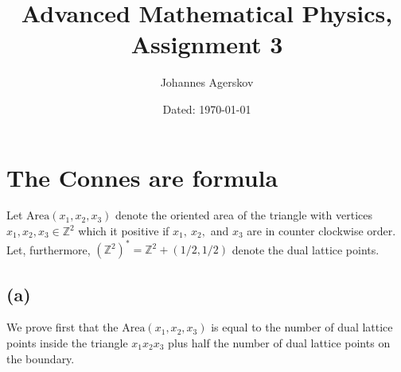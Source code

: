 \documentclass[a4paper,11pt]{article}
\author{Johannes Agerskov}
\date{Dated: \today}
\title{Advanced Mathematical Physics, Assignment 3}
\newcommand{\Z}{\mathbb{Z}}
\newcommand{\Area}{\text{Area}}
\numberwithin{equation}{section}
\begin{document}
	\maketitle

\section{The Connes are formula}
Let $ \text{Area}(x_1,x_2,x_3) $ denote the oriented area of the triangle with vertices $ x_1,x_2,x_3\in\Z^2 $ which it positive if $ x_1,\ x_2, $ and $ x_3 $ are in counter clockwise order. Let, furthermore, $ (\Z^2)^*=\Z^2+(1/2,1/2) $ denote the dual lattice points.
\subsection*{(a)}
We prove first that the $ \Area(x_1,x_2,x_3) $ is equal to the number of dual lattice points inside the triangle $ x_1x_2x_3 $ plus half the number of dual lattice points on the boundary.
\end{document}
